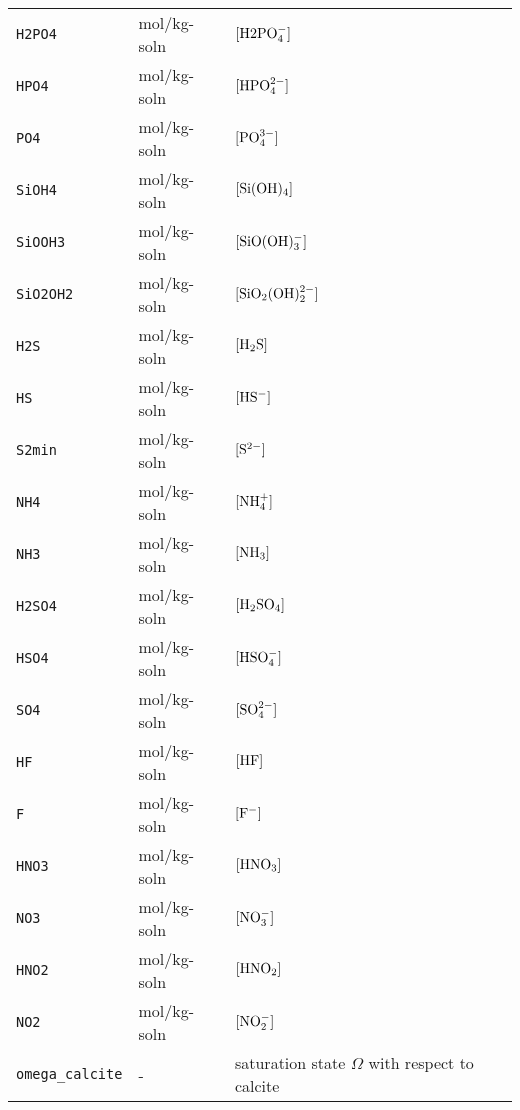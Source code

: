 \documentclass[article,nojss]{jss}
\begin{document}
\begin{footnotesize}
\begin{longtable}{l|l|p{7cm}}
\texttt{H2PO4}       & mol/kg-soln                     & $[\rm H2PO_4^-]$\\                    
\texttt{HPO4}        & mol/kg-soln                     & $[\rm HPO_4^{2-}]$\\         
\texttt{PO4}         & mol/kg-soln                     & $[\rm PO_4^{3-}]$\\         
\texttt{SiOH4}       & mol/kg-soln                     & $[\rm Si(OH)_4]$\\                    
\texttt{SiOOH3}      & mol/kg-soln                     & $[\rm SiO(OH)_3^-]$\\         
\texttt{SiO2OH2}     & mol/kg-soln                     & $[\rm SiO_2(OH)_2^{2-}]$\\         
\texttt{H2S}         & mol/kg-soln                     & $[\rm H_2S]$\\                      
\texttt{HS}          & mol/kg-soln                     & $[\rm HS^-]$\\         
\texttt{S2min}       & mol/kg-soln                     & $[\rm S^{2-}]$\\         
\texttt{NH4}         & mol/kg-soln                     & $[\rm NH_4^+]$\\                      
\texttt{NH3}         & mol/kg-soln                     & $[\rm NH_3]$\\         
\texttt{H2SO4}       & mol/kg-soln                     & $[\rm H_2SO_4]$\\         
\texttt{HSO4}        & mol/kg-soln                     & $[\rm HSO_4^-]$\\                     
\texttt{SO4}         & mol/kg-soln                     & $[\rm SO_4^{2-}]$\\         
\texttt{HF}          & mol/kg-soln                     & $[\rm HF]$\\         
\texttt{F}           & mol/kg-soln                     & $[\rm F^-]$\\                        
\texttt{HNO3}        & mol/kg-soln                     & $[\rm HNO_3]$\\
\texttt{NO3}         & mol/kg-soln                     & $[\rm NO_3^-]$\\         
\texttt{HNO2}        & mol/kg-soln                     & $[\rm HNO_2]$\\                     
\texttt{NO2}         & mol/kg-soln                     & $[\rm NO_2^-]$\\         
\texttt{omega\_calcite}   & -                          & saturation state $\Omega$ with respect to calcite\\

\end{longtable}
\end{footnotesize}
\end{document}
